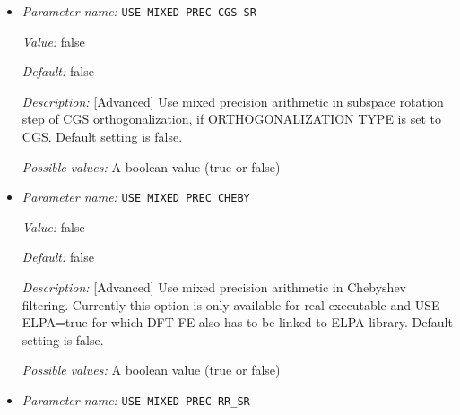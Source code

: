 \begin{itemize}
{\it Value:} false


{\it Default:} false


{\it Description:} [Advanced] Use mixed precision arithmetic in overlap matrix computation step of CGS orthogonalization, if ORTHOGONALIZATION TYPE is set to CGS. Default setting is false.


{\it Possible values:} A boolean value (true or false)
\item {\it Parameter name:} {\tt USE MIXED PREC CGS SR}
\label{parameters:SCF parameters/Eigen_2dsolver parameters/USE MIXED PREC CGS SR}
\label{parameters:SCF_20parameters/Eigen_2dsolver_20parameters/USE_20MIXED_20PREC_20CGS_20SR}


{\it Value:} false


{\it Default:} false


{\it Description:} [Advanced] Use mixed precision arithmetic in subspace rotation step of CGS orthogonalization, if ORTHOGONALIZATION TYPE is set to CGS. Default setting is false.


{\it Possible values:} A boolean value (true or false)
\item {\it Parameter name:} {\tt USE MIXED PREC CHEBY}
\label{parameters:SCF parameters/Eigen_2dsolver parameters/USE MIXED PREC CHEBY}
\label{parameters:SCF_20parameters/Eigen_2dsolver_20parameters/USE_20MIXED_20PREC_20CHEBY}


{\it Value:} false


{\it Default:} false


{\it Description:} [Advanced] Use mixed precision arithmetic in Chebyshev filtering. Currently this option is only available for real executable and USE ELPA=true for which DFT-FE also has to be linked to ELPA library. Default setting is false.


{\it Possible values:} A boolean value (true or false)
\item {\it Parameter name:} {\tt USE MIXED PREC RR\_SR}
\label{parameters:SCF parameters/Eigen_2dsolver parameters/USE MIXED PREC RR_5fSR}
\label{parameters:SCF_20parameters/Eigen_2dsolver_20parameters/USE_20MIXED_20PREC_20RR_5fSR}



\end{itemize}
